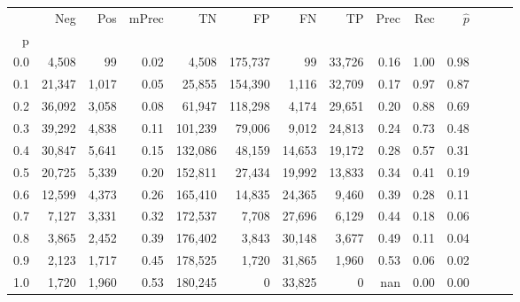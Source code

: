 \begin{tabular}{rrrrrrrrrrrrrr}
\toprule
{} &     Neg &    Pos & mPrec &       TN &       FP &      FN &      TP &  Prec &   Rec & $\hat{p}$ \\
p   &         &        &       &          &          &         &         &       &       &           \\
\midrule
0.0 &   4,508 &     99 &  0.02 &    4,508 &  175,737 &      99 &  33,726 &  0.16 &  1.00 &      0.98 \\
0.1 &  21,347 &  1,017 &  0.05 &   25,855 &  154,390 &   1,116 &  32,709 &  0.17 &  0.97 &      0.87 \\
0.2 &  36,092 &  3,058 &  0.08 &   61,947 &  118,298 &   4,174 &  29,651 &  0.20 &  0.88 &      0.69 \\
0.3 &  39,292 &  4,838 &  0.11 &  101,239 &   79,006 &   9,012 &  24,813 &  0.24 &  0.73 &      0.48 \\
0.4 &  30,847 &  5,641 &  0.15 &  132,086 &   48,159 &  14,653 &  19,172 &  0.28 &  0.57 &      0.31 \\
0.5 &  20,725 &  5,339 &  0.20 &  152,811 &   27,434 &  19,992 &  13,833 &  0.34 &  0.41 &      0.19 \\
0.6 &  12,599 &  4,373 &  0.26 &  165,410 &   14,835 &  24,365 &   9,460 &  0.39 &  0.28 &      0.11 \\
0.7 &   7,127 &  3,331 &  0.32 &  172,537 &    7,708 &  27,696 &   6,129 &  0.44 &  0.18 &      0.06 \\
0.8 &   3,865 &  2,452 &  0.39 &  176,402 &    3,843 &  30,148 &   3,677 &  0.49 &  0.11 &      0.04 \\
0.9 &   2,123 &  1,717 &  0.45 &  178,525 &    1,720 &  31,865 &   1,960 &  0.53 &  0.06 &      0.02 \\
1.0 &   1,720 &  1,960 &  0.53 &  180,245 &        0 &  33,825 &       0 &   nan &  0.00 &      0.00 \\
\bottomrule
\end{tabular}
